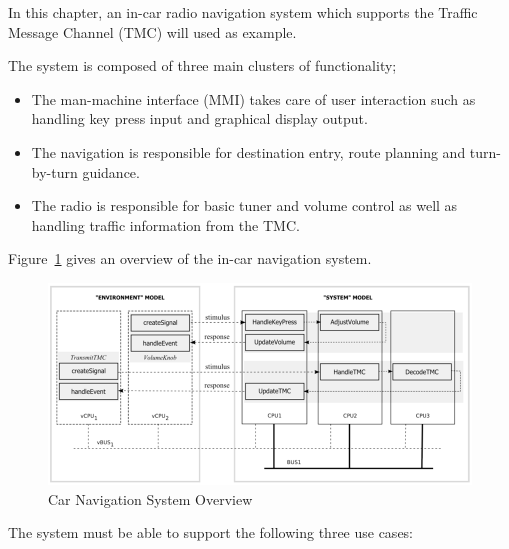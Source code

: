 In this chapter, an in-car radio navigation system which supports the Traffic Message Channel (TMC) will used as example. 

The system is composed of three main clusters of functionality; 
\begin{itemize}
\item The man-machine interface (MMI) takes care of user interaction such as handling key press input and graphical display output. 
\item The navigation is responsible for destination entry, route planning and turn-by-turn guidance. 
\item The radio is responsible for basic tuner and volume control as well as handling traffic information from the TMC.
\end{itemize}

Figure~\ref{fig:navigationoverview} gives an overview of the in-car navigation system. 

\begin{figure}[!h]
\begin{center}
  \includegraphics[width=4.5in]{figures/CarNavigationOverview}
  \caption[labelInTOC]{Car Navigation System Overview}
  \label{fig:navigationoverview}
\end{center}
\end{figure}

The system must be able to support the following three use cases:

